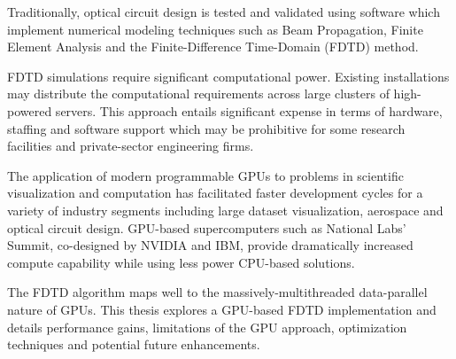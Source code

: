 Traditionally, optical circuit design is tested and validated using software which implement numerical modeling techniques such as Beam Propagation, Finite Element Analysis and the Finite-Difference Time-Domain (FDTD) method.

FDTD simulations require significant computational power. Existing installations may distribute the computational requirements across large clusters of high-powered servers. This approach entails significant expense in terms of hardware, staffing and software support which may be prohibitive for some research facilities and private-sector engineering firms.

The application of modern programmable GPUs to problems in scientific visualization and computation has facilitated faster development cycles for a variety of industry segments including large dataset visualization\cite{raycasting}, aerospace\cite{Strzodka2013381} and optical circuit design. GPU-based supercomputers such as National Labs' Summit\cite{nvidiaNationalLabs}, co-designed by NVIDIA and IBM, provide dramatically increased compute capability while using less power CPU-based solutions. 

The FDTD algorithm maps well to the massively-multithreaded data-parallel nature of GPUs. This thesis explores a GPU-based FDTD implementation and details performance gains, limitations of the GPU approach, optimization techniques and potential future enhancements. 